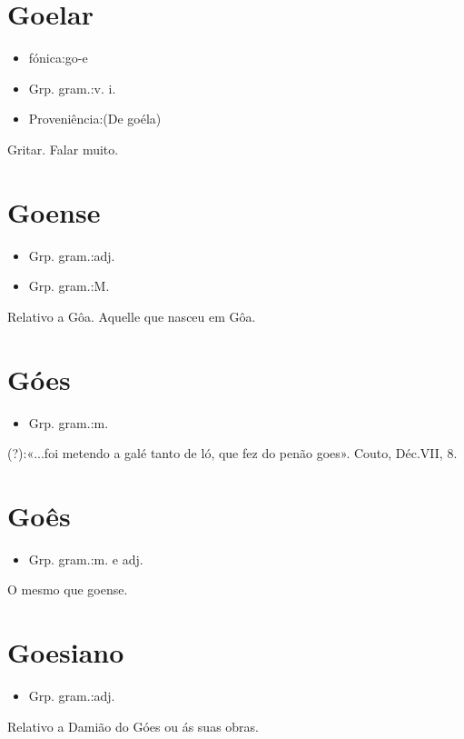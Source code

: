 \section{Goelar}
\begin{itemize}
\item {fónica:go-e}
\end{itemize}
\begin{itemize}
\item {Grp. gram.:v. i.}
\end{itemize}
\begin{itemize}
\item {Proveniência:(De \textunderscore goéla\textunderscore )}
\end{itemize}
Gritar.
Falar muito.
\section{Goense}
\begin{itemize}
\item {Grp. gram.:adj.}
\end{itemize}
\begin{itemize}
\item {Grp. gram.:M.}
\end{itemize}
Relativo a Gôa.
Aquelle que nasceu em Gôa.
\section{Góes}
\begin{itemize}
\item {Grp. gram.:m.}
\end{itemize}
(?):«\textunderscore ...foi metendo a galé tanto de ló, que fez do penão goes\textunderscore ». Couto, \textunderscore Déc.\textunderscore  VII, 8.
\section{Goês}
\begin{itemize}
\item {Grp. gram.:m.  e  adj.}
\end{itemize}
O mesmo que \textunderscore goense\textunderscore .
\section{Goesiano}
\begin{itemize}
\item {Grp. gram.:adj.}
\end{itemize}
Relativo a Damião do Góes ou ás suas obras.
